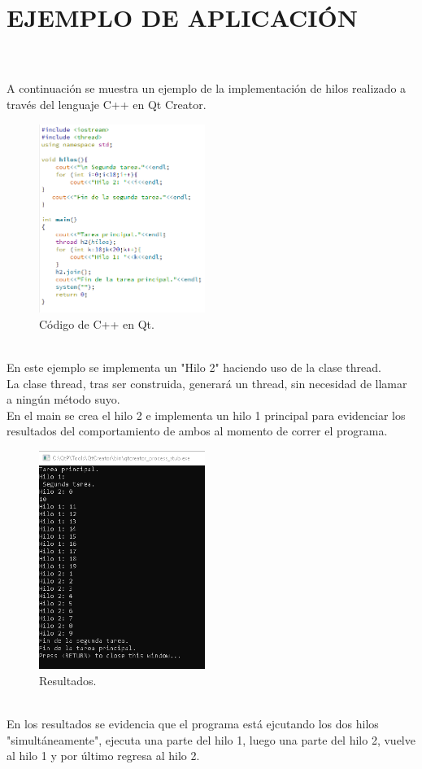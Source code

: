 \documentclass[conference]{IEEEtran}
\begin{document}
\section{EJEMPLO DE APLICACIÓN}
\\
\\
A continuación se muestra un ejemplo de la implementación de hilos realizado a través del lenguaje C++ en Qt Creator.
\\
\begin{figure}[h!]
\centering
\includegraphics[width=0.48\textwidth]{1.png}
\caption{\label{fig1} Código de C++ en Qt.}
\end{figure}
\\
En este ejemplo se implementa un "Hilo 2"  haciendo uso de la clase thread.
\\
La clase thread, tras ser construida, generará un thread, sin necesidad de llamar a ningún método suyo.
\\
En el main se crea el hilo 2 e implementa un hilo 1 principal para evidenciar los resultados del comportamiento de ambos al momento de correr el programa.
\\
\begin{figure}[h!]
\centering
\includegraphics[width=0.48\textwidth]{2.png}
\caption{\label{fig1} Resultados.}
\end{figure}
\\
En los resultados se evidencia que el programa está ejcutando los dos hilos "simultáneamente", ejecuta una parte del hilo 1, luego una parte del hilo 2, vuelve al hilo 1 y por último regresa al hilo 2.
\\
\end{document}
